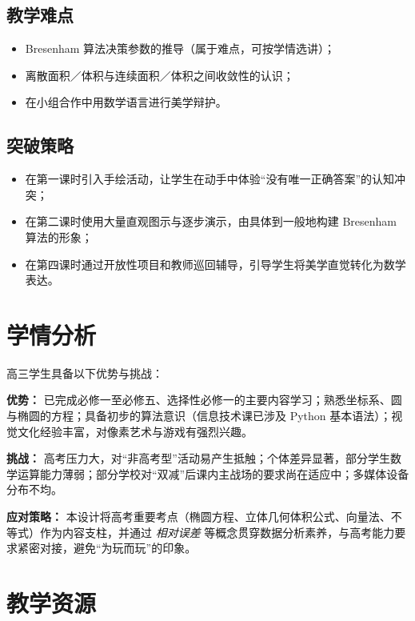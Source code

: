 \documentclass[12pt,a4paper]{scrartcl}
\begin{document}
\subsection{教学难点}
\begin{itemize}[leftmargin=1.3em,itemsep=0.15em,topsep=0.3em]
  \item Bresenham 算法决策参数的推导（属于难点，可按学情选讲）；
  \item 离散面积／体积与连续面积／体积之间收敛性的认识；
  \item 在小组合作中用数学语言进行美学辩护。
\end{itemize}

\subsection{突破策略}
\begin{itemize}[leftmargin=1.3em,itemsep=0.15em,topsep=0.3em]
  \item 在第一课时引入手绘活动，让学生在动手中体验“没有唯一正确答案”的认知冲突；
  \item 在第二课时使用大量直观图示与逐步演示，由具体到一般地构建 Bresenham 算法的形象；
  \item 在第四课时通过开放性项目和教师巡回辅导，引导学生将美学直觉转化为数学表达。
\end{itemize}

\section{学情分析}

高三学生具备以下优势与挑战：

\textbf{优势：} 已完成必修一至必修五、选择性必修一的主要内容学习；熟悉坐标系、圆与椭圆的方程；具备初步的算法意识（信息技术课已涉及 Python 基本语法）；视觉文化经验丰富，对像素艺术与游戏有强烈兴趣。

\textbf{挑战：} 高考压力大，对“非高考型”活动易产生抵触；个体差异显著，部分学生数学运算能力薄弱；部分学校对“双减”后课内主战场的要求尚在适应中；多媒体设备分布不均。

\textbf{应对策略：} 本设计将高考重要考点（椭圆方程、立体几何体积公式、向量法、不等式）作为内容支柱，并通过 \emph{相对误差} 等概念贯穿数据分析素养，与高考能力要求紧密对接，避免“为玩而玩”的印象。

\section{教学资源}
\end{document}
